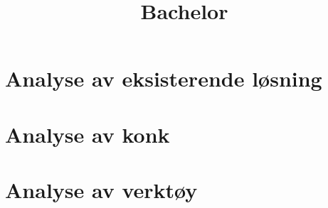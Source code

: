 \documentclass[11pt,a4paper]{report}
\begin{document}
\title{Bachelor}
\maketitle

\section*{Analyse av eksisterende løsning}

\section*{Analyse av konk}

\section*{Analyse av verktøy}
\end{document}
